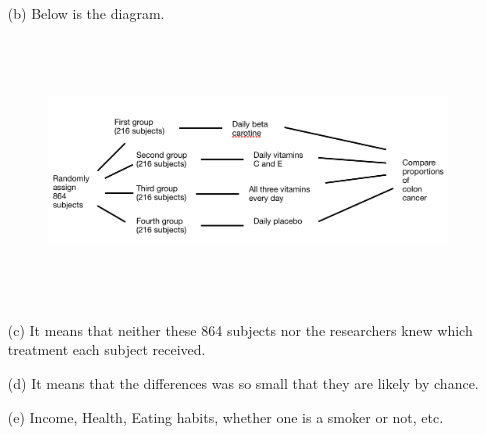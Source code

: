 \documentclass[11pt, a4paper]{article}
\begin{document}
\begin{itemize}
\begin{itemize}
\item[(b)]
Below is the diagram.
\begin{figure}[h]
    \centering
    \includegraphics[width=15cm, height=7cm]{diagram_1}
\end{figure}

\item[]

\item[(c)]
It means that neither these 864 subjects nor the researchers
knew which treatment each subject received.

\item[]

\item[(d)]
It means that the differences was so small that they are likely by chance.

\item[]

\item[(e)]
Income, Health, Eating habits, whether one is a smoker or not, etc.
\end{itemize}

\end{itemize}
\end{document}
